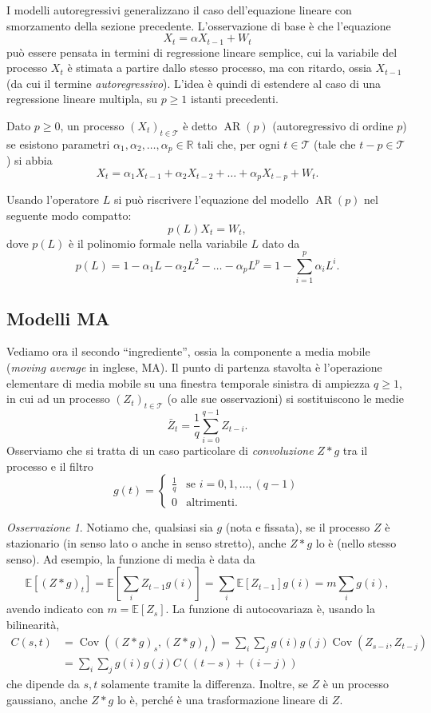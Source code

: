 \documentclass[
  italian,
  letterpaper,
]{book}
\newcommand{\bra}[1]{\left( #1 \right)}
\newcommand{\sqa}[1]{\left[ #1 \right]}
\newcommand{\R}{\mathbb{R}}
\newcommand{\E}[1]{\mathbb{E}\sqa{#1}}
\newcommand{\Cov}[1]{\operatorname{Cov}\bra{#1}}
\theoremstyle{definition}
\theoremstyle{remark}
\newtheorem*{remark}{Osservazione}
\begin{document}
I modelli autoregressivi generalizzano il caso dell'equazione lineare
con smorzamento della sezione precedente. L'osservazione di base è che
l'equazione \[ X_t = \alpha X_{t-1} + W_t\] può essere pensata in
termini di regressione lineare semplice, cui la variabile del processo
\(X_t\) è stimata a partire dallo stesso processo, ma con ritardo, ossia
\(X_{t-1}\) (da cui il termine \emph{autoregressivo}). L'idea è quindi
di estendere al caso di una regressione lineare multipla, su \(p \ge 1\)
istanti precedenti.

Dato \(p \ge 0\), un processo \((X_t)_{t \in \mathcal{T}}\) è detto
\(\operatorname{AR}(p)\) (autoregressivo di ordine \(p\)) se esistono
parametri \(\alpha_1, \alpha_2, \ldots, \alpha_p \in \R\) tali che, per
ogni \(t \in \mathcal{T}\) (tale che \(t-p \in \mathcal{T}\)) si abbia
\[ X_t = \alpha_1 X_{t-1} + \alpha_2 X_{t-2}+ \ldots + \alpha_p X_{t-p } +W_t.\]

Usando l'operatore \(L\) si può riscrivere l'equazione del modello
\(\operatorname{AR}(p)\) nel seguente modo compatto:
\[ p(L) X_t = W_t,\] dove \(p(L)\) è il polinomio formale nella
variabile \(L\) dato da
\[ p(L) = 1- \alpha_1L -\alpha_2L ^2 - \ldots  - \alpha_p L^p = 1 - \sum_{i=1}^p \alpha_i L^i.\]

\subsection{Modelli MA}\label{modelli-ma}

Vediamo ora il secondo ``ingrediente'', ossia la componente a media
mobile (\emph{moving average} in inglese, MA). Il punto di partenza
stavolta è l'operazione elementare di media mobile su una finestra
temporale sinistra di ampiezza \(q \ge 1\), in cui ad un processo
\((Z_t)_{t \in \mathcal{T}}\) (o alle sue osservazioni) si sostituiscono
le medie \[ \bar{Z}_t = \frac 1 q \sum_{i=0}^{q-1} Z_{t-i}.\] Osserviamo
che si tratta di un caso particolare di \emph{convoluzione} \(Z * g\)
tra il processo e il filtro
\[ g (t ) = \begin{cases} \frac 1 q & \text{se $i=0,1, \ldots, (q-1)$}\\
 0 & \text{altrimenti.}\end{cases}
 \]

\begin{remark}
Notiamo che, qualsiasi sia \(g\) (nota e fissata), se il processo \(Z\)
è stazionario (in senso lato o anche in senso stretto), anche \(Z * g\)
lo è (nello stesso senso). Ad esempio, la funzione di media è data da
\[\E{ (Z * g)_t} = \E{ \sum_i Z_{t-1} g(i)} =  \sum_i \E{Z_{t-1} } g(i) = m \sum_i g(i),\]
avendo indicato con \(m = \E{Z_s}\). La funzione di autocovariaza è,
usando la bilinearità,
\[ \begin{split} C(s,t) & = \Cov{ (Z * g)_s, (Z*g)_t} = \sum_{i} \sum_j g(i) g(j) \Cov{Z_{s-i}, Z_{t-j}}\\
&= \sum_{i} \sum_j g(i) g(j) C( (t-s) + (i-j))
\end{split}\] che dipende da \(s,t\) solamente tramite la differenza.
Inoltre, se \(Z\) è un processo gaussiano, anche \(Z*g\) lo è, perché è
una trasformazione lineare di \(Z\).
\end{remark}
\end{document}
